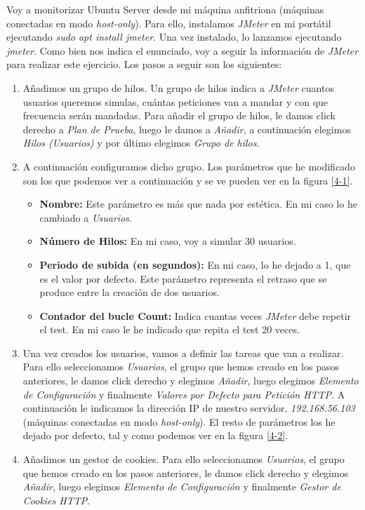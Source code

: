 \documentclass[a4paper,titlepage,12pt]{scrartcl}	%
\numberwithin{figure}{section} %
\numberwithin{table}{section} %
\begin{document}
	Voy a monitorizar Ubuntu Server desde mi máquina anfitriona (máquinas conectadas en modo \textit{host-only}). Para ello, instalamos \textit{JMeter} en mi portátil ejecutando \textit{sudo apt install jmeter}. Una vez instalado, lo lanzamos ejecutando \textit{jmeter}. Como bien nos indica el enunciado, voy a seguir la información de \textit{JMeter} \cite{jmeter} para realizar este ejercicio. Los pasos a seguir son los siguientes:
	\begin{enumerate}
		\item Añadimos un grupo de hilos. Un grupo de hilos indica a \textit{JMeter} cuantos usuarios queremos simulas, cuántas peticiones van a mandar y con que frecuencia serán mandadas. Para añadir el grupo de hilos, le damos click derecho a \textit{Plan de Prueba}, luego le damos a \textit{Añadir}, a continuación elegimos \textit{Hilos (Usuarios)} y por último elegimos \textit{Grupo de hilos}.
		\item A continuación configuramos dicho grupo. Los parámetros que he modificado son los que podemos ver a continuación y se ve pueden ver en la figura \ref{4-1}.
		\begin{itemize}
			\item \textbf{Nombre:} Este parámetro es más que nada por estética. En mi caso lo he cambiado a \textit{Usuarios}.
			\item \textbf{Número de Hilos:} En mi caso, voy a simular 30 usuarios.
			\item \textbf{Periodo de subida (en segundos):} En mi caso, lo he dejado a 1, que es el valor por defecto. Este parámetro representa el retraso que se produce entre la creación de dos usuarios.
			\item \textbf{Contador del bucle Count:} Indica cuantas veces \textit{JMeter} debe repetir el test. En mi caso le he indicado que repita el test 20 veces.
		\end{itemize}
		\item Una vez creados los usuarios, vamos a definir las tareas que van a realizar. Para ello seleccionamos \textit{Usuarios}, el grupo que hemos creado en los pasos anteriores, le damos click derecho y elegimos \textit{Añadir}, luego elegimos \textit{Elemento de Configuración} y finalmente \textit{Valores por Defecto para Petición HTTP}. A continuación le indicamos la dirección IP de nuestro servidor, \textit{192.168.56.103} (máquinas conectadas en modo \textit{host-only}). El resto de parámetros los he dejado por defecto, tal y como podemos ver en la figura \ref{4-2}.
		\item Añadimos un gestor de cookies. Para ello seleccionamos \textit{Usuarios}, el grupo que hemos creado en los pasos anteriores, le damos click derecho y elegimos \textit{Añadir}, luego elegimos \textit{Elemento de Configuración} y finalmente \textit{Gestor de Cookies HTTP}.

\end{enumerate}
\end{document}
